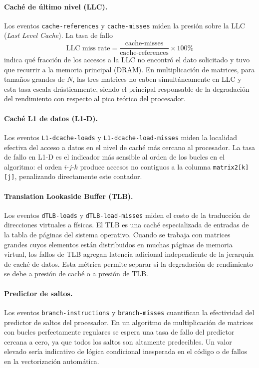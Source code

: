 \paragraph{Caché de último nivel (LLC).}
Los eventos \texttt{cache-references} y \texttt{cache-misses} miden la presión
sobre la LLC (\textit{Last Level Cache}).
La tasa de fallo
\begin{equation}
    \text{LLC miss rate} = \frac{\text{cache-misses}}{\text{cache-references}} \times 100\%
\end{equation}
indica qué fracción de los accesos a la LLC no encontró el dato solicitado y tuvo
que recurrir a la memoria principal (DRAM).
En multiplicación de matrices, para tamaños grandes de $N$, las tres matrices no
caben simultáneamente en LLC y esta tasa escala drásticamente, siendo el principal
responsable de la degradación del rendimiento con respecto al pico teórico del
procesador.

\paragraph{Caché L1 de datos (L1-D).}
Los eventos \texttt{L1-dcache-loads} y \texttt{L1-dcache-load-misses} miden la
localidad efectiva del acceso a datos en el nivel de caché más cercano al
procesador.
La tasa de fallo en L1-D es el indicador más sensible al orden de los bucles en
el algoritmo: el orden $i$-$j$-$k$ produce accesos no contiguos a la
columna \texttt{matrix2[k][j]}, penalizando directamente este contador.

\paragraph{Translation Lookaside Buffer (TLB).}
Los eventos \texttt{dTLB-loads} y \texttt{dTLB-load-misses} miden el costo
de la traducción de direcciones virtuales a físicas.
El TLB es una caché especializada de entradas de la tabla de páginas del sistema
operativo.
Cuando se trabaja con matrices grandes cuyos elementos están distribuidos en
muchas páginas de memoria virtual, los fallos de TLB agregan latencia adicional
independiente de la jerarquía de caché de datos.
Esta métrica permite separar si la degradación de rendimiento se debe a presión
de caché o a presión de TLB.

\paragraph{Predictor de saltos.}
Los eventos \texttt{branch-instructions} y \texttt{branch-misses} cuantifican la
efectividad del predictor de saltos del procesador.
En un algoritmo de multiplicación de matrices con bucles perfectamente regulares
se espera una tasa de fallo del predictor cercana a cero, ya que todos los saltos
son altamente predecibles.
Un valor elevado sería indicativo de lógica condicional inesperada en el código
o de fallos en la vectorización automática.

